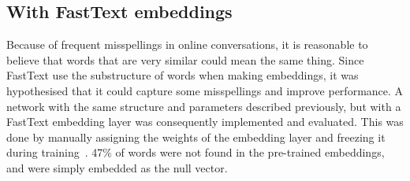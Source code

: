 \subsection{With FastText embeddings} 
Because of frequent misspellings in online conversations,
it is reasonable to believe that words that are very similar could
mean the same thing. Since FastText use the substructure of words when
making embeddings, it was hypothesised that it could capture
some misspellings and improve performance. A network with the same
structure and parameters described previously, but with a FastText embedding layer was
consequently implemented and evaluated. This was done by manually
assigning the weights of the embedding layer and freezing it during training~\cite{keras-using-embeddings}.
47\% of words were not found in the pre-trained embeddings, and were simply
embedded as the null vector.